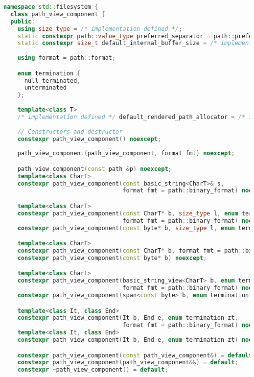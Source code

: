 \documentclass[11pt]{article}
\begin{document}
\begin{lstlisting}[language=cpp]
namespace std::filesystem {
  class path_view_component {
  public:
    using size_type = /* implementation defined */;
    static constexpr path::value_type preferred_separator = path::preferred_separator;
    static constexpr size_t default_internal_buffer_size = /* implementation defined */;
    
    using format = path::format;

    enum termination {
      null_terminated,
      unterminated
    };
    
    template<class T>
    /* implementation defined */ default_rendered_path_allocator = /* implementation defined */;
    
    // Constructors and destructor
    constexpr path_view_component() noexcept;
    
    path_view_component(path_view_component, format fmt) noexcept;

    path_view_component(const path &p) noexcept;
    template<class CharT>
    constexpr path_view_component(const basic_string<CharT>& s,
                                  format fmt = path::binary_format) noexcept;

    template<class CharT>
    constexpr path_view_component(const CharT* b, size_type l, enum termination zt,
                                  format fmt = path::binary_format) noexcept;
    constexpr path_view_component(const byte* b, size_type l, enum termination zt) noexcept;

    template<class CharT>
    constexpr path_view_component(const CharT* b, format fmt = path::binary_format) noexcept;
    constexpr path_view_component(const byte* b) noexcept;

    template<class CharT>
    constexpr path_view_component(basic_string_view<CharT> b, enum termination zt,
                                  format fmt = path::binary_format) noexcept;
    constexpr path_view_component(span<const byte> b, enum termination zt) noexcept;

    template<class It, class End>
    constexpr path_view_component(It b, End e, enum termination zt,
                                  format fmt = path::binary_format) noexcept;
    template<class It, class End>
    constexpr path_view_component(It b, End e, enum termination zt) noexcept;

    constexpr path_view_component(const path_view_component&) = default;
    constexpr path_view_component(path_view_component&&) = default;
    constexpr ~path_view_component() = default;
    

\end{lstlisting}
\end{document}
